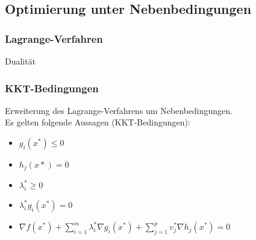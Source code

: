 \subsection{Optimierung unter Nebenbedingungen}
\subsubsection{Lagrange-Verfahren}
Dualität\\

\subsubsection{KKT-Bedingungen}
Erweiterung des Lagrange-Verfahrens um Nebenbedingungen.\\
Es gelten folgende Aussagen (KKT-Bedingungen):

\begin{itemize}
    \item \(g_i(x^*)\leq 0\)
    \item \(h_j(x*)=0\)
    \item \(\lambda_i^*\geq 0\)
    \item \(\lambda_i^*g_i(x^*)=0\)
    \item $\nabla f(x^*) + \sum_{i=1}^m \lambda_i^* \nabla g_i(x^*) + \sum_{j=1}^p v_j^* \nabla h_j(x^*) = 0$
\end{itemize}
